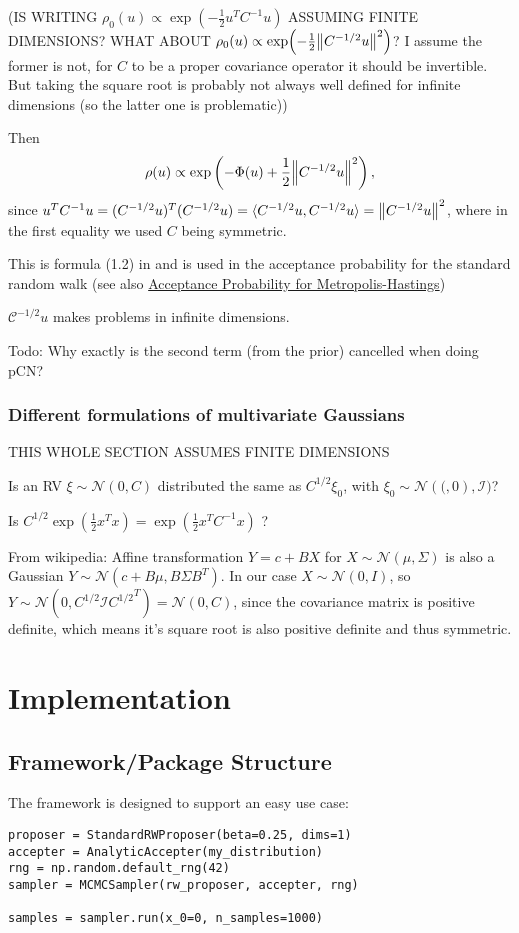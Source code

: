 \documentclass[11pt]{article}
\newcommand{\C}{{\mathcal{C}}}
\newcommand{\I}{{\mathcal{I}}}
\newcommand{\N}[2]{\mathcal{N}\left(#1,#2\right)}
\begin{document}
(IS WRITING \(\rho_0(u) \propto \exp(-\frac{1}{2} u^TC^{-1}u)\) ASSUMING FINITE DIMENSIONS? WHAT
ABOUT \(\rho_0(u) \propto \exp(-\frac{1}{2} \norm{C^{-1/2}u}^2)\)? I assume the former is not,
for \(C\) to be a proper covariance operator it should be invertible. But taking the square root
is probably not always well defined for infinite dimensions (so the latter one is problematic))

Then $$\rho(u) \propto \exp\left( -\Phi(u) + \frac{1}{2} \norm{C^{-1/2}u}^2 \right),$$
since \(u^T C^{-1} u = (C^{-1/2} u)^T(C^{-1/2} u) = \langle C^{-1/2}u, C^{-1/2}u \rangle = \norm{C^{-1/2} u}^2\),
where in the first equality we used \(C\) being symmetric.

This is formula (1.2) in \cite{cotter_mcmc_2013} and is used in the acceptance probability for
the standard random walk (see also \hyperref[sec:org1c2fb5c]{Acceptance Probability for Metropolis-Hastings})

\(\C^{-1/2}u\) makes problems in infinite dimensions.

Todo: Why exactly is the second term (from the prior) cancelled when doing pCN?
\subsubsection{Different formulations of multivariate Gaussians}
\label{sec:org9b541e4}
THIS WHOLE SECTION ASSUMES FINITE DIMENSIONS

Is an RV \(\xi \sim \N{0}{C}\) distributed the same as \(C^{1/2}\xi_0\), with \(\xi_0 \sim \N(0, \I)\)?

Is \(C^{1/2}\exp(\frac{1}{2} x^Tx) = \exp(\frac{1}{2} x^T C^{-1} x)\) ?

From wikipedia: Affine transformation \(Y = c + BX\) for \(X \sim \N{\mu}{\Sigma}\) is also a Gaussian
\(Y \sim \N{c + B\mu}{B\Sigma B^T}\). In our case \(X \sim \N{0}{I}\), so \(Y \sim \N{0}{C^{1/2}\I {C^{1/2}}^{T}} = \N{0}{C}\),
since the covariance matrix is positive definite, which means it's square root is also positive definite
and thus symmetric.

\section{Implementation}
\label{sec:orgd82f85b}
\subsection{Framework/Package Structure}
\label{sec:org1973776}
The framework is designed to support an easy use case:
\begin{verbatim}
proposer = StandardRWProposer(beta=0.25, dims=1)
accepter = AnalyticAccepter(my_distribution)
rng = np.random.default_rng(42)
sampler = MCMCSampler(rw_proposer, accepter, rng)

samples = sampler.run(x_0=0, n_samples=1000)
\end{verbatim}
\end{document}

